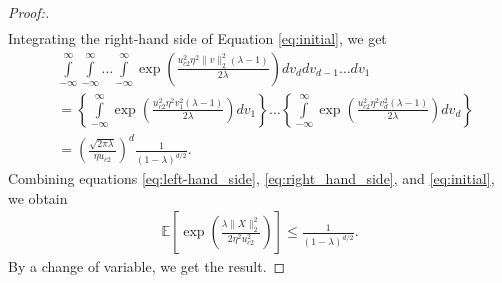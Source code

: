 \documentclass[letterpaper, 10 pt]{article}
\newcommand{\E}{\mathbb{E}}
\begin{document}
\begin{proof}[Proof:]
\begin{align}
\end{align}
Integrating the right-hand side of Equation \eqref{eq:initial}, we get
    \begin{align}
    &\int\limits_{-\infty}^\infty \int\limits_{-\infty}^\infty\dots\int\limits_{-\infty}^\infty \exp\left( \frac{u_{c2}^2\eta^2 \|v\|^2_2(\lambda-1)}{2\lambda}\right) dv_d dv_{d-1}\dots dv_{1} \nonumber\\
    &=\left\{\int\limits_{-\infty}^\infty  \exp\left( \frac{u_{c2}^2\eta^2 v_1^2(\lambda-1)}{2\lambda}\right) dv_1\right\} \dots \left\{\int\limits_{-\infty}^\infty  \exp\left( \frac{u_{c2}^2\eta^2 v_d^2(\lambda-1)}{2\lambda}\right) dv_d\right\}\nonumber\\
    &= \left(\frac{\sqrt{2\pi\lambda}}{\eta u_{c2}}\right)^d \frac{1}{(1-\lambda)^{d/2}}.\label{eq:right_hand_side}
    \end{align}
    Combining equations \eqref{eq:left-hand_side}, \eqref{eq:right_hand_side}, and  \eqref{eq:initial}, we obtain
    \begin{align*}
        \E\left[ \exp\left(\frac{\lambda\|X\|^2_2}{2\eta^2u_{c2}^2} \right) \right] \leq  \frac{1}{(1-\lambda)^{d/2}}.
    \end{align*}
    By a change of variable, we get the result. 
\end{proof}
\end{document}
